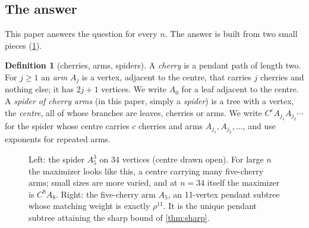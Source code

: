 \documentclass[11pt]{article}
\theoremstyle{definition}
\newtheorem{definition}[theorem]{Definition}
\begin{document}
\subsection{The answer}

This paper answers the question for every $n$. The answer is built from two small pieces (\cref{fig:spider}).

\begin{definition}[cherries, arms, spiders]
A \emph{cherry} is a pendant path of length two. For $j\ge1$ an \emph{arm} $A_j$ is a vertex, adjacent
to the centre, that carries $j$ cherries and nothing else; it has $2j+1$ vertices. We write $A_0$ for
a leaf adjacent to the centre. A \emph{spider of cherry arms} (in this paper, simply a \emph{spider})
is a tree with a vertex, the \emph{centre}, all of whose branches are leaves, cherries or arms. We write
$C^{c}A_{j_1}A_{j_2}\cdots$ for the spider whose centre carries $c$ cherries and arms
$A_{j_1},A_{j_2},\dots$, and use exponents for repeated arms.
\end{definition}

\begin{figure}[htbp]\centering
{}
\qquad
{}
\caption{Left: the spider $A_5^{3}$ on 34 vertices (centre drawn open). For large $n$ the maximizer
looks like this, a centre carrying many five-cherry arms; small sizes are more varied, and at $n=34$
itself the maximizer is $C^8A_8$. Right: the five-cherry arm $A_5$, an 11-vertex pendant subtree whose
matching weight is exactly $\rho^{11}$. It is the unique pendant subtree attaining the sharp bound of
\cref{thm:sharp}.}
\label{fig:spider}
\end{figure}
\end{document}
